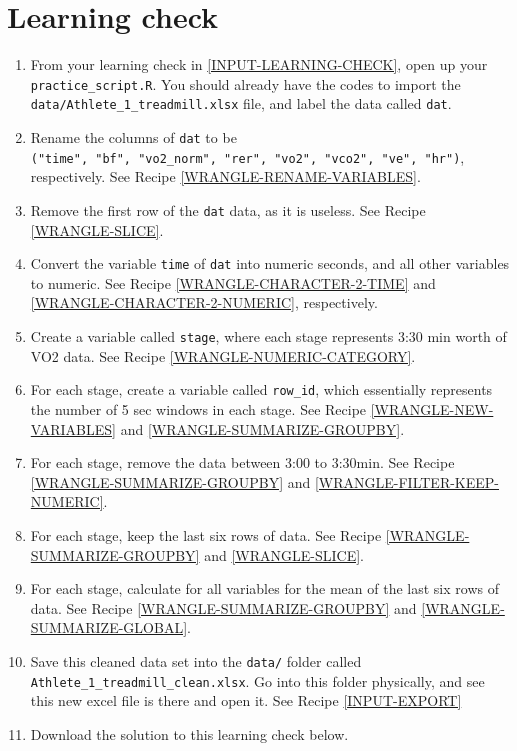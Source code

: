 \documentclass[
]{book}
\begin{document}
\hypertarget{WRANGLE-LEARNING-CHECK}{%
\section{Learning check}\label{WRANGLE-LEARNING-CHECK}}

\begin{enumerate}
\def\labelenumi{\arabic{enumi}.}
\item
  From your learning check in \ref{INPUT-LEARNING-CHECK}, open up your \texttt{practice\_script.R}. You should already have the codes to import the \texttt{data/Athlete\_1\_treadmill.xlsx} file, and label the data called \texttt{dat}.
\item
  Rename the columns of \texttt{dat} to be \texttt{("time",\ "bf",\ "vo2\_norm",\ "rer",\ "vo2",\ "vco2",\ "ve",\ "hr")}, respectively. See Recipe \ref{WRANGLE-RENAME-VARIABLES}.
\item
  Remove the first row of the \texttt{dat} data, as it is useless. See Recipe \ref{WRANGLE-SLICE}.
\item
  Convert the variable \texttt{time} of \texttt{dat} into numeric seconds, and all other variables to numeric. See Recipe \ref{WRANGLE-CHARACTER-2-TIME} and \ref{WRANGLE-CHARACTER-2-NUMERIC}, respectively.
\item
  Create a variable called \texttt{stage}, where each stage represents 3:30 min worth of VO2 data. See Recipe \ref{WRANGLE-NUMERIC-CATEGORY}.
\item
  For each stage, create a variable called \texttt{row\_id}, which essentially represents the number of 5 sec windows in each stage. See Recipe \ref{WRANGLE-NEW-VARIABLES} and \ref{WRANGLE-SUMMARIZE-GROUPBY}.
\item
  For each stage, remove the data between 3:00 to 3:30min. See Recipe \ref{WRANGLE-SUMMARIZE-GROUPBY} and \ref{WRANGLE-FILTER-KEEP-NUMERIC}.
\item
  For each stage, keep the last six rows of data. See Recipe \ref{WRANGLE-SUMMARIZE-GROUPBY} and \ref{WRANGLE-SLICE}.
\item
  For each stage, calculate for all variables for the mean of the last six rows of data. See Recipe \ref{WRANGLE-SUMMARIZE-GROUPBY} and \ref{WRANGLE-SUMMARIZE-GLOBAL}.
\item
  Save this cleaned data set into the \texttt{data/} folder called \texttt{Athlete\_1\_treadmill\_clean.xlsx}. Go into this folder physically, and see this new excel file is there and open it. See Recipe \ref{INPUT-EXPORT}
\item
  Download the solution to this learning check below.
\end{enumerate}
\end{document}
